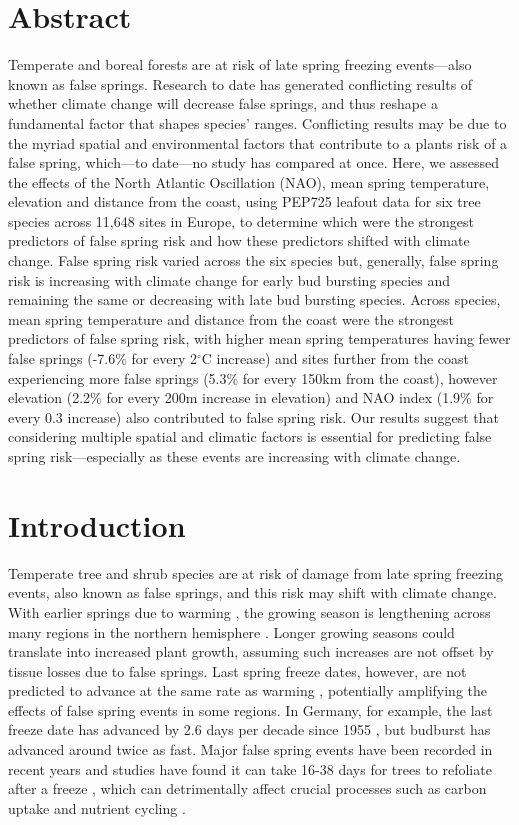 \documentclass{article}\usepackage[]{graphicx}\usepackage[]{color}
\begin{document}
\section*{Abstract}
Temperate and boreal forests are at risk of late spring freezing events---also known as false springs. Research to date has generated conflicting results of whether climate change will decrease false springs, and thus reshape a fundamental factor that shapes species' ranges. Conflicting results may be due to the myriad spatial and environmental factors that contribute to a plants risk of a false spring, which---to date---no study has compared at once. Here, we assessed the effects of the North Atlantic Oscillation (NAO), mean spring temperature, elevation and distance from the coast, using PEP725 leafout data for six tree species across 11,648 sites in Europe, to determine which were the strongest predictors of false spring risk and how these predictors shifted with climate change. False spring risk varied across the six species but, generally, false spring risk is increasing with climate change for early bud bursting species and remaining the same or decreasing with late bud bursting species. Across species, mean spring temperature and distance from the coast were the strongest predictors of false spring risk, with higher mean spring temperatures having fewer false springs (-7.6\% for every 2$^{\circ}$C increase) and sites further from the coast experiencing more false springs (5.3\% for every 150km from the coast), however elevation (2.2\% for every 200m increase in elevation) and NAO index (1.9\% for every 0.3 increase) also contributed to false spring risk. Our results suggest that considering multiple spatial and climatic factors is essential for predicting false spring risk---especially as these events are increasing with climate change.

\section*{Introduction}
Temperate tree and shrub species are at risk of damage from late spring freezing events, also known as false springs, and this risk may shift with climate change. With earlier springs due to warming \citep{IPCC2014, Wolkovich2012}, the growing season is lengthening across many regions in the northern hemisphere \citep{Chen2005, Kukal2018, Liu2006}. Longer growing seasons could translate into increased plant growth, assuming such increases are not offset by tissue losses due to false springs. Last spring freeze dates, however, are not predicted to advance at the same rate as warming \citep{Inouye2008, Labe2016, Martin2010,Wypych2016a,Sgubin2018}, potentially amplifying the effects of false spring events in some regions. In Germany, for example, the last freeze date has advanced by 2.6 days per decade since 1955 \citep{Zohner2016}, but budburst has advanced around twice as fast. Major false spring events have been recorded in recent years and studies have found it can take 16-38 days for trees to refoliate after a freeze \citep{Augspurger2009, Augspurger2013, Gu2008, Menzel2015}, which can detrimentally affect crucial processes such as carbon uptake and nutrient cycling \citep{Hufkens2012, Klosterman2018, Richardson2013}. 
\end{document}
